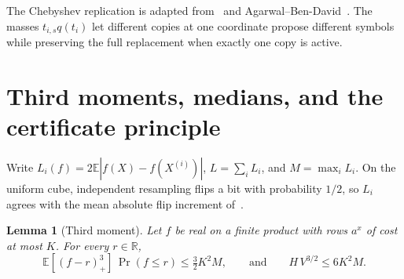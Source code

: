 \documentclass[11pt]{article}
\numberwithin{equation}{section}
\newcommand{\E}{\mathbb{E}}
\newcommand{\R}{\mathbb{R}}
\theoremstyle{plain}
\newtheorem{lem}{Lemma}
\theoremstyle{remark}
\begin{document}
The Chebyshev replication is adapted from~\cite[Section~6]{Tur26} and Agarwal--Ben-David~\cite{ABD26}. The masses $t_{i,s}q(t_i)$ let different copies at one coordinate propose different symbols while preserving the full replacement when exactly one copy is active.

\section{Third moments, medians, and the certificate principle}\label{sec:thirdmoment}
Write $L_i(f)=2\E|f(X)-f(X^{(i)})|$, $L=\sum_iL_i$, and $M=\max_iL_i$. On the uniform cube, independent resampling flips a bit with probability $1/2$, so $L_i$ agrees with the mean absolute flip increment of~\cite{Tur26}.

\begin{lem}[Third moment]\label{lem:C}
Let $f$ be real on a finite product with rows $a^x$ of cost at most $K$. For every $r\in\R$,
\[
\E[(f-r)_+^3]\,\Pr(f\le r)\le\tfrac32K^2M,\qquad\text{and}\qquad H\,V^{3/2}\le6K^2M.
\]
\end{lem}
\end{document}
